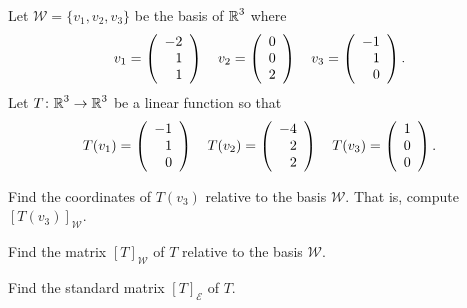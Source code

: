 \documentclass{ximera}
\author{Matthew Carr \& Marty Golubitsky}
\begin{document}
\begin{exercise}\label{mc.exerciseErr3}
Let $\mathcal{W} = \{v_1,v_2,v_3\}$ be the basis of $\mbox{$\mathbb{R}$}^3$ where
\[
v_1=\left(\begin{array}{rrrrrrrrrrrrrrrrrr} -2 \\ 1 \\ 1 \end{array}\right) \quad v_2=\left(\begin{array}{rrrrrrrrrrrrrrrrrr} 0 \\ 0 \\ 2 \end{array}\right) \quad v_3=\left(\begin{array}{rrrrrrrrrrrrrrrrrr} -1 \\ 1 \\ 0 \end{array}\right).
\]
Let  $T\colon \mbox{$\mathbb{R}$}^3\rightarrow\mbox{$\mathbb{R}$}^3$ be a linear function so that
\[
T(v_1)=\left(\begin{array}{rrrrrrrrrrrrrrrrrr} -1 \\ 1 \\ 0 \end{array}\right) \quad T(v_2)=\left(\begin{array}{rrrrrrrrrrrrrrrrrr} -4 \\ 2 \\ 2 \end{array}\right)  \quad T(v_3)=\left(\begin{array}{rrrrrrrrrrrrrrrrrr} 1 \\ 0 \\ 0 \end{array}\right).
\]
\begin{enumeratea}%
\item Find the coordinates of $T(v_3)$ relative to the basis $\mathcal{W}$. That is, compute $[T(v_3)]_\mathcal{W}$.
\item Find the  matrix $[T]_\mathcal{W}$ of $T$ relative to the basis $\mathcal{W}$.
\item Find the standard matrix $[T]_{\mathcal{E}}$ of $T$. 
\end{enumeratea}


\end{exercise}
\end{document}

